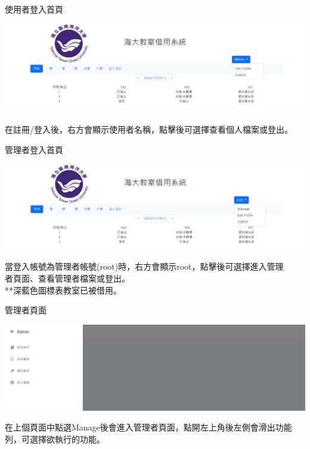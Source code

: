 \documentclass{article}
\begin{document}
	\begin{Large}
		使用者登入首頁
	\end{Large}
	\bigskip
	\begin{center}
		\includegraphics[scale=0.35]{SDDUserLoginnedFirstpage.png}
	\end{center}
	在註冊/登入後，右方會顯示使用者名稱，點擊後可選擇查看個人檔案或登出。

	\bigskip
	\bigskip
	\bigskip
	\bigskip
	\bigskip

	\begin{Large}
		管理者登入首頁
	\end{Large}
	\bigskip
	\begin{center}
		\includegraphics[scale=0.65]{SDDAdminLoginnedFirstpage.png}
	\end{center}
	\bigskip
	當登入帳號為管理者帳號(root)時，右方會顯示root，點擊後可選擇進入管理
	\\者頁面、查看管理者檔案或登出。
	\\**深藍色圖標表教室已被借用。
	\newpage

	\begin{Large}
		管理者頁面
	\end{Large}
	\bigskip
	\begin{center}
		\includegraphics[scale=0.35]{SDDAdminPage.png}
	\end{center}
	\bigskip
	\bigskip
	在上個頁面中點選Manage後會進入管理者頁面，點開左上角後左側會滑出功能列，可選擇欲執行的功能。
	
\end{document}
